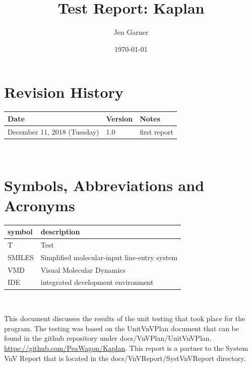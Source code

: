 \documentclass[12pt, titlepage]{article}
\begin{document}
\title{Test Report: Kaplan} 
\author{Jen Garner}
\date{\today}
	
\maketitle


\section{Revision History}

\begin{tabularx}{\textwidth}{p{3cm}p{2cm}X}
\toprule {\bf Date} & {\bf Version} & {\bf Notes}\\
\midrule
December 11, 2018 (Tuesday) & 1.0 & first report \\
\bottomrule
\end{tabularx}

~\newpage

\section{Symbols, Abbreviations and Acronyms}

\renewcommand{\arraystretch}{1.2}
\begin{tabular}{l l} 
  \toprule		
  \textbf{symbol} & \textbf{description}\\
  \midrule 
  T & Test\\
  SMILES & Simplified molecular-input line-entry system \\
  VMD & Visual Molecular Dynamics \\
  IDE & integrated development environment \\
  \bottomrule
\end{tabular}\\

\newpage

\tableofcontents

\listoftables %

\listoffigures %

\newpage


This document discusses the results of the unit testing that took place for the 
\progname{} program. The testing was based on the UnitVnVPlan document that can 
be found in the github repository under docs/VnVPlan/UnitVnVPlan. 
\url{https://github.com/PeaWagon/Kaplan}. This report is a partner to the 
System VnV Report that is located in the docs/VnVReport/SystVnVReport directory.
\end{document}
